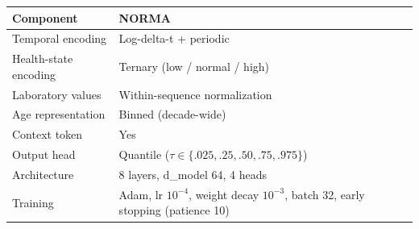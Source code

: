 \begin{table}[ht]
\centering
\footnotesize
\begin{tabular}{lp{8cm}}
\toprule
Component & NORMA \\
\midrule
Temporal encoding & Log-delta-t + periodic \\
Health-state encoding & Ternary (low / normal / high) \\
Laboratory values & Within-sequence normalization \\
Age representation & Binned (decade-wide) \\
Context token & Yes \\
Output head & Quantile ($\tau \in \{.025,.25,.50,.75,.975\}$) \\
Architecture & 8 layers, d\_model 64, 4 heads \\
Training & Adam, lr $10^{-4}$, weight decay $10^{-3}$, batch 32, early stopping (patience 10) \\
\bottomrule
\end{tabular}
\label{tab:03_hyperparams}
\end{table}